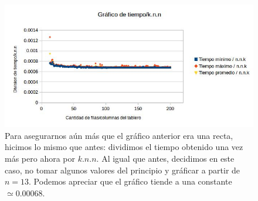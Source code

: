 \documentclass[a4paper]{article}
\begin{document}
\begin{figure}[t!]
\centering
\includegraphics[width=\textwidth]{conjBconst13.jpg}\caption{Para asegurarnos aún más que el gráfico anterior era una recta, hicimos lo mismo que antes: dividimos el tiempo obtenido una vez más pero ahora por $k.n.n$. Al igual que antes, decidimos en este caso, no tomar algunos valores del principio y gráficar a partir de $n = 13$. Podemos apreciar que el gráfico tiende a una constante $\simeq 0.00068$.}
\end{figure}
\end{document}
